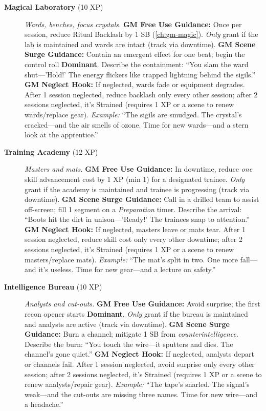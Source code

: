 \begin{description}
  \item[\textbf{Magical Laboratory} (10 XP)]   
        \emph{Wards, benches, focus crystals.}  
        \textbf{GM Free Use Guidance:} Once per session, reduce Ritual Backlash by 1 SB (\ref{ch:gm-magic}). \emph{Only} grant if the lab is maintained and wards are intact (track via downtime).  
        \textbf{GM Scene Surge Guidance:} Contain an emergent effect for one beat; begin the control roll \textbf{Dominant}. Describe the containment: ``You slam the ward shut---'Hold!' The energy flickers like trapped lightning behind the sigils.''  
        \textbf{GM Neglect Hook:} If neglected, wards fade or equipment degrades. After 1 session neglected, reduce backlash only every other session; after 2 sessions neglected, it's Strained (requires 1 XP or a scene to renew wards/replace gear).  
        \textit{Example:} ``The sigils are smudged. The crystal's cracked---and the air smells of ozone. Time for new wards---and a stern look at the apprentice.''  

  \item[\textbf{Training Academy} (12 XP)]   
        \emph{Masters and mats.}  
        \textbf{GM Free Use Guidance:} In downtime, reduce \emph{one} skill advancement cost by 1 XP (min 1) for a designated trainee. \emph{Only} grant if the academy is maintained and trainee is progressing (track via downtime).  
        \textbf{GM Scene Surge Guidance:} Call in a drilled team to assist off-screen; fill 1 segment on a \emph{Preparation} timer. Describe the arrival: ``Boots hit the dirt in unison---'Ready!' The trainees snap to attention.''  
        \textbf{GM Neglect Hook:} If neglected, masters leave or mats tear. After 1 session neglected, reduce skill cost only every other downtime; after 2 sessions neglected, it's Strained (requires 1 XP or a scene to renew masters/replace mats).  
        \textit{Example:} ``The mat's split in two. One more fall---and it's useless. Time for new gear---and a lecture on safety.''  

  \item[\textbf{Intelligence Bureau} (10 XP)]   
        \emph{Analysts and cut-outs.}  
        \textbf{GM Free Use Guidance:} Avoid surprise; the first recon opener starts \textbf{Dominant}. \emph{Only} grant if the bureau is maintained and analysts are active (track via downtime).  
        \textbf{GM Scene Surge Guidance:} Burn a channel; mitigate 1 SB from \emph{counterintelligence}. Describe the burn: ``You touch the wire---it sputters and dies. The channel's gone quiet.''  
        \textbf{GM Neglect Hook:} If neglected, analysts depart or channels fail. After 1 session neglected, avoid surprise only every other session; after 2 sessions neglected, it's Strained (requires 1 XP or a scene to renew analysts/repair gear).  
        \textit{Example:} ``The tape's snarled. The signal's weak---and the cut-outs are missing three names. Time for new wire---and a headache.''  
\end{description}

